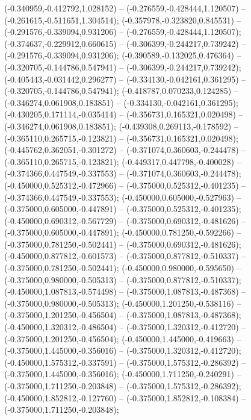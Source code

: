  (-0.340959,-0.412792,1.028152) -- (-0.276559,-0.428444,1.120507) -- (-0.261615,-0.511651,1.304514);
 (-0.357978,-0.323820,0.845531) -- (-0.291576,-0.339094,0.931206) -- (-0.276559,-0.428444,1.120507);
 (-0.374637,-0.229912,0.660615) -- (-0.306399,-0.244217,0.739242) -- (-0.291576,-0.339094,0.931206);
 (-0.390589,-0.132025,0.476364) -- (-0.320705,-0.144786,0.547941) -- (-0.306399,-0.244217,0.739242);
 (-0.405443,-0.031442,0.296277) -- (-0.334130,-0.042161,0.361295) -- (-0.320705,-0.144786,0.547941);
 (-0.418787,0.070233,0.124285) -- (-0.346274,0.061908,0.183851) -- (-0.334130,-0.042161,0.361295);
 (-0.430205,0.171114,-0.035414) -- (-0.356731,0.165321,0.020498) -- (-0.346274,0.061908,0.183851);
 (-0.439308,0.269113,-0.178592) -- (-0.365110,0.265715,-0.123821) -- (-0.356731,0.165321,0.020498);
 (-0.445762,0.362051,-0.301272) -- (-0.371074,0.360603,-0.244478) -- (-0.365110,0.265715,-0.123821);
 (-0.449317,0.447798,-0.400028) -- (-0.374366,0.447549,-0.337553) -- (-0.371074,0.360603,-0.244478);
 (-0.450000,0.525312,-0.472966) -- (-0.375000,0.525312,-0.401235) -- (-0.374366,0.447549,-0.337553);
 (-0.450000,0.605000,-0.527963) -- (-0.375000,0.605000,-0.447891) -- (-0.375000,0.525312,-0.401235);
 (-0.450000,0.690312,-0.567729) -- (-0.375000,0.690312,-0.481626) -- (-0.375000,0.605000,-0.447891);
 (-0.450000,0.781250,-0.592266) -- (-0.375000,0.781250,-0.502441) -- (-0.375000,0.690312,-0.481626);
 (-0.450000,0.877812,-0.601573) -- (-0.375000,0.877812,-0.510337) -- (-0.375000,0.781250,-0.502441);
 (-0.450000,0.980000,-0.595650) -- (-0.375000,0.980000,-0.505313) -- (-0.375000,0.877812,-0.510337);
 (-0.450000,1.087813,-0.574498) -- (-0.375000,1.087813,-0.487368) -- (-0.375000,0.980000,-0.505313);
 (-0.450000,1.201250,-0.538116) -- (-0.375000,1.201250,-0.456504) -- (-0.375000,1.087813,-0.487368);
 (-0.450000,1.320312,-0.486504) -- (-0.375000,1.320312,-0.412720) -- (-0.375000,1.201250,-0.456504);
 (-0.450000,1.445000,-0.419663) -- (-0.375000,1.445000,-0.356016) -- (-0.375000,1.320312,-0.412720);
 (-0.450000,1.575312,-0.337591) -- (-0.375000,1.575312,-0.286392) -- (-0.375000,1.445000,-0.356016);
 (-0.450000,1.711250,-0.240291) -- (-0.375000,1.711250,-0.203848) -- (-0.375000,1.575312,-0.286392);
 (-0.450000,1.852812,-0.127760) -- (-0.375000,1.852812,-0.108384) -- (-0.375000,1.711250,-0.203848);
